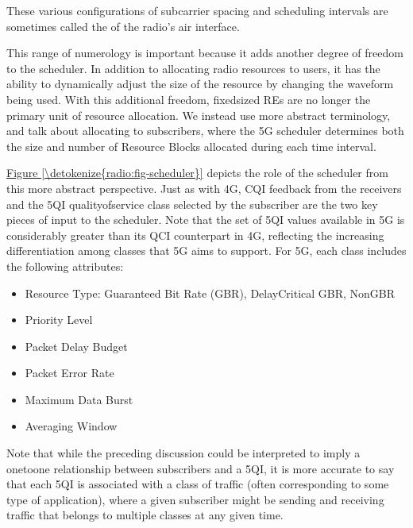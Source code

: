 \documentclass[a4paper,11pt,english]{sphinxmanual}
\begin{document}
\sphinxAtStartPar
These various configurations of subcarrier spacing and scheduling
intervals are sometimes called the  of the radio’s air
interface.

\sphinxAtStartPar
This range of numerology is important because it adds another degree
of freedom to the scheduler. In addition to allocating radio resources
to users, it has the ability to dynamically adjust the size of the
resource by changing the waveform being used. With this additional
freedom, fixed\sphinxhyphen{}sized REs are no longer the primary unit of resource
allocation. We instead use more abstract terminology, and talk about
allocating  to subscribers, where the 5G scheduler
determines both the size and number of Resource Blocks allocated
during each time interval.

\sphinxAtStartPar
\hyperref[\detokenize{radio:fig-scheduler}]{Figure \ref{\detokenize{radio:fig-scheduler}}} depicts the role of the scheduler
from this more abstract perspective. Just as with 4G, CQI
feedback from the receivers and the 5QI quality\sphinxhyphen{}of\sphinxhyphen{}service class
selected by the subscriber are the two key pieces of input to the
scheduler. Note that the set of 5QI values available in 5G is
considerably greater than its QCI counterpart in 4G,
reflecting the increasing differentiation among classes that 5G aims
to support. For 5G, each class includes the following attributes:
\begin{itemize}
\item {} 
\sphinxAtStartPar
Resource Type: Guaranteed Bit Rate (GBR), Delay\sphinxhyphen{}Critical GBR, Non\sphinxhyphen{}GBR

\item {} 
\sphinxAtStartPar
Priority Level

\item {} 
\sphinxAtStartPar
Packet Delay Budget

\item {} 
\sphinxAtStartPar
Packet Error Rate

\item {} 
\sphinxAtStartPar
Maximum Data Burst

\item {} 
\sphinxAtStartPar
Averaging Window

\end{itemize}

\sphinxAtStartPar
Note that while the preceding discussion could be interpreted to imply a
one\sphinxhyphen{}to\sphinxhyphen{}one relationship between subscribers and a 5QI, it is more
accurate to say that each 5QI is associated with a class of traffic
(often corresponding to some type of application), where a given
subscriber might be sending and receiving traffic that belongs to
multiple classes at any given time.
\end{document}
